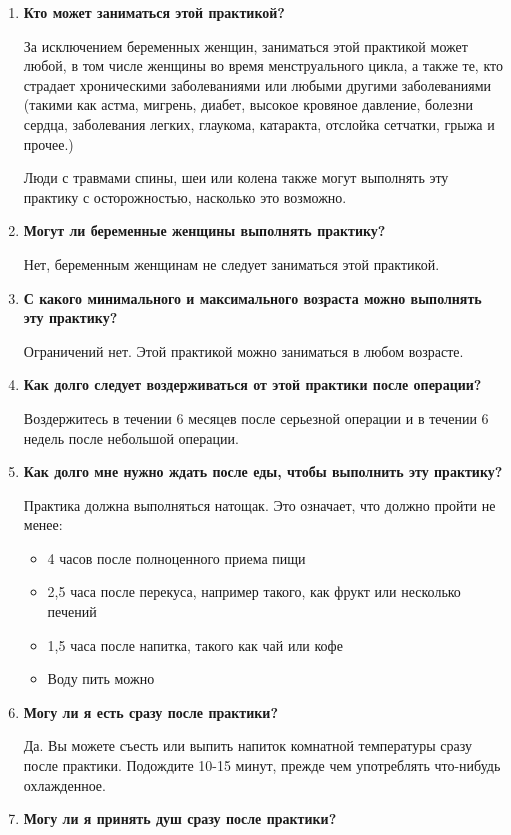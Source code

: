 \documentclass[
a4paper, %
12pt, %
article,
onecolumn, %
openany, %
]{memoir}
\begin{document}
\begin{enumerate}
    
    \item \textbf{Кто может заниматься этой практикой?}

За исключением беременных женщин, заниматься этой практикой может любой, в том
числе женщины во время менструального цикла, а также те, кто страдает
хроническими заболеваниями или любыми другими заболеваниями (такими как астма,
мигрень, диабет, высокое кровяное давление, болезни сердца, заболевания легких,
глаукома, катаракта, отслойка сетчатки, грыжа и прочее.)

Люди с травмами спины, шеи или колена также могут выполнять эту практику с
осторожностью, насколько это возможно.
\item \textbf{Могут ли беременные женщины выполнять практику?}

Нет, беременным женщинам не следует заниматься этой практикой.
\item \textbf{С какого минимального и максимального возраста можно выполнять эту практику?}

Ограничений нет. Этой практикой можно заниматься в любом возрасте.
\item \textbf{Как долго следует воздерживаться от этой практики после операции?}

Воздержитесь в течении 6 месяцев после серьезной операции и в течении 6 недель
после небольшой операции.


\item \textbf{Как долго мне нужно ждать после еды, чтобы выполнить эту практику?}

Практика должна выполняться натощак.
Это означает, что должно пройти не менее:
\begin{itemize}
\item 4 часов после полноценного приема пищи
\item 2,5 часа после перекуса, например такого, как фрукт или несколько печений
\item 1,5 часа после напитка, такого как чай или кофе
\item Воду пить можно
\end{itemize}

\item \textbf{Могу ли я есть сразу после практики?}

Да. Вы можете съесть или выпить напиток комнатной температуры сразу после
практики. Подождите 10-15 минут, прежде чем употреблять что-нибудь охлажденное.
\item \textbf{Могу ли я принять душ сразу после практики?}


\end{enumerate}
\end{document}
